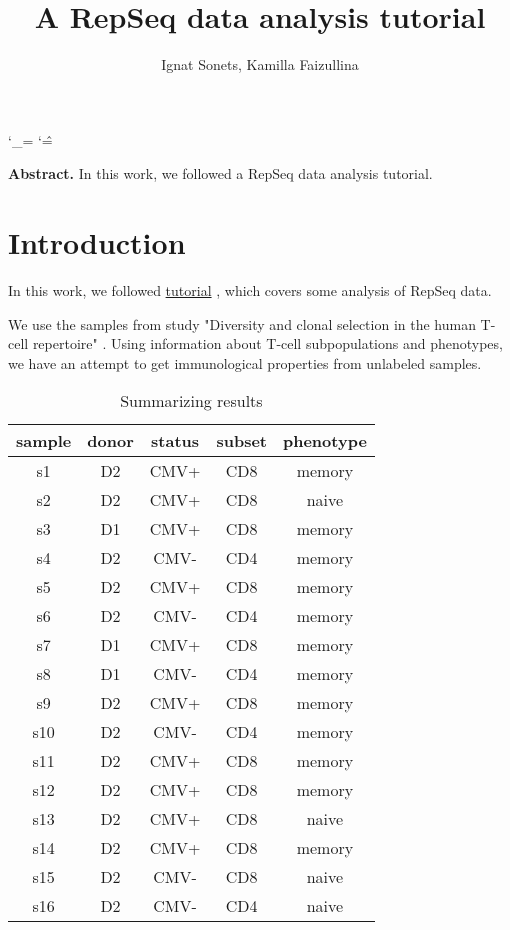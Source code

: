 \documentclass{article}
\title{A RepSeq data analysis tutorial }
\author{ Ignat Sonets, Kamilla Faizullina}
\date{\empty}
\begin{document}
 	
 	\catcode`\_=\active
 	\catcode`\^=\active
 	
 	\maketitle
 	
 	\textbf{Abstract.}  In this work, we followed a RepSeq data analysis tutorial.  
 	\section{Introduction}
In this work, we followed \href{https://github.com/antigenomics/repseq-annotation-tutorial}{tutorial} \cite{git}, which covers some analysis of RepSeq data.


We use the samples from study "Diversity and clonal selection in the human T-cell repertoire" \cite{pnas}. Using information about T-cell subpopulations and phenotypes, we have an attempt to get immunological properties from unlabeled samples. 

   	\begin{table}[h]
 	\centering
 	\begin{tabular}{|c|c|c|c|c|}
 		\hline
 	sample &	donor &	status &	subset&	phenotype \\ \hline
 	s1	& D2	&	CMV+		& CD8 &	memory \\ \hline
 	s2	&D2		&CMV+	&	CD8	& naive \\ \hline
 	s3	&D1		&CMV+	&	CD8	& memory\\ \hline
 	s4	&D2		&CMV-	&	CD4	& memory\\ \hline
 	s5	&D2		&CMV+	&	CD8	& memory\\ \hline
 	s6	&D2		&CMV-	&	CD4	& memory\\ \hline
 	s7	&D1		&CMV+	&	CD8	& memory\\ \hline
 	s8	&D1		&CMV-	&	CD4	& memory\\ \hline
 	s9	&D2		&CMV+	&	CD8	& memory\\ \hline
 	s10	&D2		&CMV-	&	CD4	& memory\\ \hline		
 	s11	&D2		&CMV+	&	CD8	& memory\\ \hline
 	s12	&D2		&CMV+	&	CD8 &	memory\\ \hline
 	s13	&D2		&CMV+	&	CD8	&naive\\ \hline
 	s14	&D2		&CMV+	&	CD8	&memory\\ \hline
 	s15	&D2		&CMV-	&	CD8	&naive\\ \hline
 	s16&	D2	&	CMV-	&	CD4	&naive\\ \hline
 		
 		\hline	 
 		
 	\end{tabular}
  	\caption{ Summarizing results  }
  \label{tab:var}
\end{table}
\end{document}
